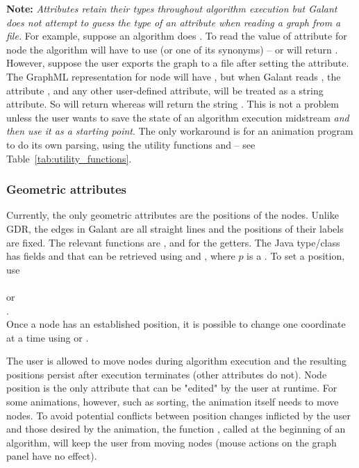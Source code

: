 \textbf{Note:} \emph{Attributes retain their types throughout algorithm
  execution but Galant does not attempt to guess the type of an attribute
  when reading a graph from a file.}
For example, suppose an algorithm does .
To read the value of attribute  for node  the algorithm
will have to use  (or one of its synonyms) --
 or  will return
. 
However, suppose the user exports the graph to a file 
after setting the attribute.
The GraphML representation for node  will have ,
but when Galant reads , the attribute , and any
other user-defined attribute, will be treated as a string attribute. So  
 will return  whereas
 will return the string .
This is not a problem unless the user wants to save the state of an algorithm
execution midstream \emph{and then use it as a starting point}.
The only workaround is for an animation program to do its own parsing, using
the utility functions  and  -- see
Table~\ref{tab:utility_functions}.

\subsubsection{Geometric attributes}

Currently, the only geometric attributes are the positions of the
nodes. 
Unlike GDR, the edges in Galant
are all straight lines and the positions of their labels are fixed.
The relevant functions are
, 
and 
for the getters. The Java type/class  has fields  and
 that can be retrieved using  and , where $p$
is a . To set a position, use\\
\hspace*{2em}\\
or\\
\hspace*{2em}.\\
Once a node has an established position, it is possible to change
one coordinate at a time using  or
.

The user is allowed to move nodes during algorithm execution
and the resulting positions persist after execution terminates
(other attributes do not).
Node position is the only attribute that can be "edited" by the user
at runtime.
For some animations, however, such as sorting,
the animation itself needs to move
nodes.
To avoid potential conflicts between position changes inflicted by the user
and those desired by the animation,
the function , called at the beginning of an algorithm,
will keep the user from moving nodes (mouse actions on the graph panel have
no effect).

